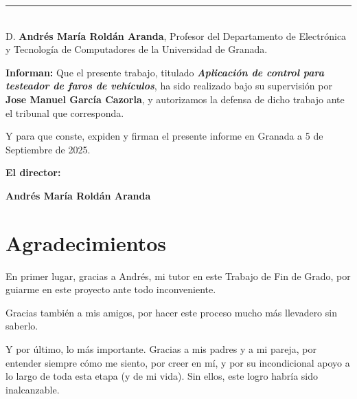 \noindent\rule[-1ex]{\textwidth}{2px}\\[4.5ex]

D. \textbf{Andrés María Roldán Aranda}, Profesor del Departamento de Electrónica y Tecnología de Computadores de la Universidad de Granada.

\vspace{0.5cm}

\textbf{Informan:}
Que el presente trabajo, titulado \textit{\textbf{Aplicación de control para testeador de faros de vehículos}}, ha sido realizado bajo su supervisión por \textbf{Jose Manuel García Cazorla}, y autorizamos la defensa de dicho trabajo ante el tribunal que corresponda.

\vspace{0.5cm}

Y para que conste, expiden y firman el presente informe en Granada a 5 de Septiembre de 2025.

\vspace{1cm}

\textbf{El director:}

\vspace{5cm}

\noindent\textbf{Andrés María Roldán Aranda}

\chapter*{Agradecimientos}

En primer lugar, gracias a Andrés, mi tutor en este Trabajo de Fin de Grado, por guiarme en este proyecto ante todo inconveniente.

Gracias también a mis amigos, por hacer este proceso mucho más llevadero sin saberlo.

Y por último, lo más importante. Gracias a mis padres y a mi pareja, por entender siempre cómo me siento, por creer en mí, y por su incondicional apoyo a lo largo de toda esta etapa (y de mi vida). Sin ellos, este logro habría sido inalcanzable.

\thispagestyle{empty}

\vspace{1cm}
